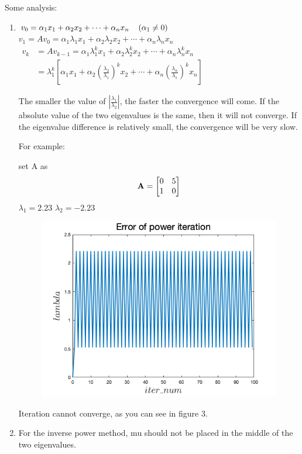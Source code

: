\documentclass[english,onecolumn]{IEEEtran}
\newcommand{\bA}{{\bf A}}
\begin{document}
\begin{enumerate}
Some analysis:\\
\begin{enumerate}
	\item $
	v_{0}=\alpha_{1} x_{1}+\alpha_{2} x_{2}+\cdots+\alpha_{n} x_{n} \quad\left(\alpha_{1} \neq 0\right) \\$
	$
	v_{1}=A v_{0}=\alpha_{1} \lambda_{1} x_{1}+\alpha_{2} \lambda_{2} x_{2}+\cdots+\alpha_{n} \lambda_{n} x_{n}$\\
	$
	\begin{aligned}
		v_{k} &=A v_{k-1}=\alpha_{1} \lambda_{1}^{k} x_{1}+\alpha_{2} \lambda_{2}^{k} x_{2}+\cdots+\alpha_{n} \lambda_{n}^{k} x_{n} \\
		&=\lambda_{1}^{k}\left[\alpha_{1} x_{1}+\alpha_{2}\left(\frac{\lambda_{2}}{\lambda_{1}}\right)^{k} x_{2}+\cdots+\alpha_{n}\left(\frac{\lambda_{n}}{\lambda_{1}}\right)^{k} x_{n}\right]
	\end{aligned}
	$
	
	
	The smaller the value of $|\frac{\lambda_1}{\lambda_2}|$, the faster the convergence will come. If the absolute value of the two eigenvalues is the same, then it will not converge. If the eigenvalue difference is relatively small, the convergence will be very slow.
	
	For example:
	
	set A as \[
	\bA = \begin{bmatrix}
		0 & 5 \\
		1 & 0
	\end{bmatrix}
	\]
	$\lambda_1 = 2.23$ $\lambda_2 = -2.23$ 
	\begin{figure}
		\centering
		\includegraphics[width=0.5\linewidth]{code/power_iter_not}
		\caption{}
		\label{fig:poweriternot}
	\end{figure}
	Iteration cannot converge, as you can see in figure 3.
	
	\item For the inverse power method, mu should not be placed in the middle of the two eigenvalues.
	

\end{enumerate}
\end{enumerate}
\end{document}

